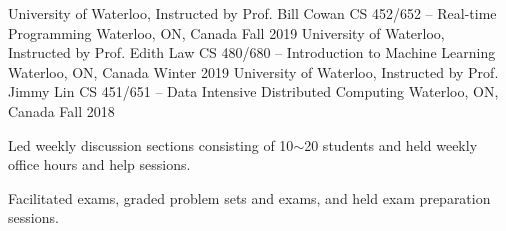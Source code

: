 


\begin{cventries}
\cventrynodesc
{University of Waterloo, Instructed by Prof. Bill Cowan} %
{CS 452/652 -- Real-time Programming} %
{Waterloo, ON, Canada} %
{Fall 2019} %
\cventrynodesc
{University of Waterloo, Instructed by Prof. Edith Law} %
{CS 480/680 -- Introduction to Machine Learning} %
{Waterloo, ON, Canada} %
{Winter 2019} %
\cventry
{University of Waterloo, Instructed by Prof. Jimmy Lin} %
{CS 451/651 -- Data Intensive Distributed Computing} %
{Waterloo, ON, Canada} %
{Fall 2018} %
{ %
\begin{cvitems}
\item {Led weekly discussion sections consisting of 10$\sim$20 students and held weekly office hours and help sessions.}
\item {Facilitated exams, graded problem sets and exams, and held exam preparation sessions.}
\end{cvitems}
}
\end{cventries}

